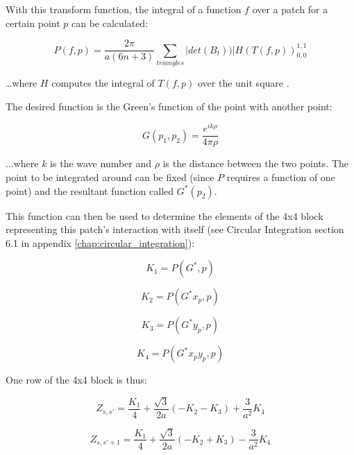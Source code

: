 \documentclass[etd,senior,noacknowledgments]{BYUPhys}
\begin{document}
With this transform function, the integral of a function $f$ over a patch for a certain point $p$ can be calculated:

\begin{equation}
  P\left(f,p\right)=\frac{2\pi}{a\left(6n+3\right)}\sum_{triangles}|det\left(B_{t}\right))|H\left(T\left(f,p\right)\right)_{0,0}^{1,1}
\end{equation}

\ldots where $H$ computes the integral of $T\left(f,p\right)$ over the unit square \cite{HCubature}.

The desired function is the Green's function of the point with another point:

\begin{equation} \label{eq:greens}
  G\left(p_{1},p_{2}\right)=\frac{e^{ik\rho}}{4\pi\rho}
\end{equation}

...where $k$ is the wave number and $\rho$ is the distance between the two points. The point to be integrated around can be fixed (since $P$ requires a function of one point) and the resultant function called $G^{*}\left(p_{2}\right)$.

This function can then be used to determine the elements of the 4x4 block representing this patch's interaction with itself (see Circular Integration section 6.1 in appendix \ref{chap:circular_integration}):

\begin{equation}
  K_{1}=P\left(G^{*},p\right)
\end{equation}

\begin{equation}
  K_{2}=P\left(G^{*}x_{p},p\right)
\end{equation}

\begin{equation}
  K_{3}=P\left(G^{*}y_{p},p\right)
\end{equation}

\begin{equation}
  K_{4}=P\left(G^{*}x_{p}y_{p},p\right)
\end{equation}

One row of the 4x4 block is thus:

\begin{equation}
  Z_{s,s'}=\frac{K_{1}}{4}+\frac{\sqrt{3}}{2a}\left(-K_{2}-K_{3}\right)+\frac{3}{a^{2}}K_{4}
\end{equation}

\begin{equation}
  Z_{s,s'+1}=\frac{K_{1}}{4}+\frac{\sqrt{3}}{2a}\left(-K_{2}+K_{3}\right)-\frac{3}{a^{2}}K_{4}
\end{equation}
\end{document}

